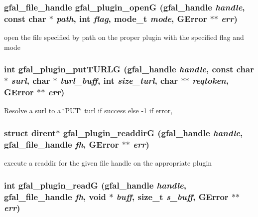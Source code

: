 \subsubsection{\setlength{\rightskip}{0pt plus 5cm}gfal\_\-file\_\-handle gfal\_\-plugin\_\-open\-G (gfal\_\-handle {\em handle}, const char $\ast$ {\em path}, int {\em flag}, mode\_\-t {\em mode}, GError $\ast$$\ast$ {\em err})}\label{gfal__common__plugin_8h_322dfbe0ad1e144573719ed08151281e}


open the file specified by path on the proper plugin with the specified flag and mode 
\subsubsection{\setlength{\rightskip}{0pt plus 5cm}int gfal\_\-plugin\_\-put\-TURLG (gfal\_\-handle {\em handle}, const char $\ast$ {\em surl}, char $\ast$ {\em turl\_\-buff}, int {\em size\_\-turl}, char $\ast$$\ast$ {\em reqtoken}, GError $\ast$$\ast$ {\em err})}\label{gfal__common__plugin_8h_9f133a0e4bd9d07ad6a745a775fea289}


Resolve a surl to a \char`\"{}PUT\char`\"{} turl  if success else -1 if error, 
\subsubsection{\setlength{\rightskip}{0pt plus 5cm}struct dirent$\ast$ gfal\_\-plugin\_\-readdir\-G (gfal\_\-handle {\em handle}, gfal\_\-file\_\-handle {\em fh}, GError $\ast$$\ast$ {\em err})}\label{gfal__common__plugin_8h_7fd9e55c89de0f0a85127972cecffcfd}


execute a readdir for the given file handle on the appropriate plugin 
\subsubsection{\setlength{\rightskip}{0pt plus 5cm}int gfal\_\-plugin\_\-read\-G (gfal\_\-handle {\em handle}, gfal\_\-file\_\-handle {\em fh}, void $\ast$ {\em buff}, size\_\-t {\em s\_\-buff}, GError $\ast$$\ast$ {\em err})}\label{gfal__common__plugin_8h_d536879bc7813a35bc79318ce43f0b57}


